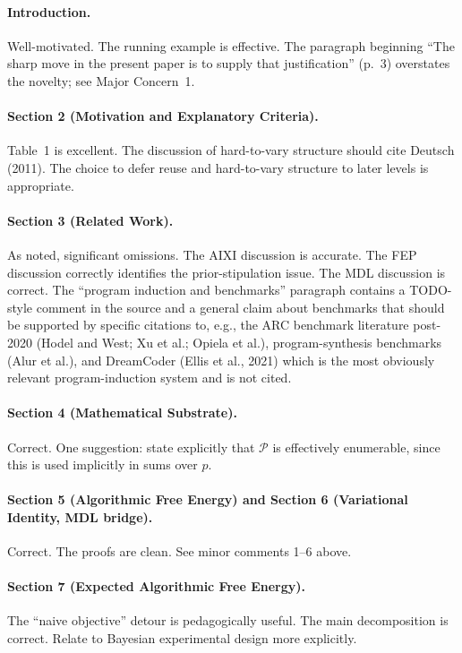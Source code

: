 \documentclass[11pt]{article}
\begin{document}
\paragraph{Introduction.} Well-motivated. The running example is effective. The paragraph beginning ``The sharp move in the present paper is to supply that justification'' (p.~3) overstates the novelty; see Major Concern~1.

\paragraph{Section 2 (Motivation and Explanatory Criteria).} Table~1 is excellent. The discussion of hard-to-vary structure should cite Deutsch (2011). The choice to defer reuse and hard-to-vary structure to later levels is appropriate.

\paragraph{Section 3 (Related Work).} As noted, significant omissions. The AIXI discussion is accurate. The FEP discussion correctly identifies the prior-stipulation issue. The MDL discussion is correct. The ``program induction and benchmarks'' paragraph contains a TODO-style comment in the source and a general claim about benchmarks that should be supported by specific citations to, e.g., the ARC benchmark literature post-2020 (Hodel and West; Xu et al.; Opiela et al.), program-synthesis benchmarks (Alur et al.), and DreamCoder (Ellis et al., 2021) which is the most obviously relevant program-induction system and is not cited.

\paragraph{Section 4 (Mathematical Substrate).} Correct. One suggestion: state explicitly that $\mathcal{P}$ is effectively enumerable, since this is used implicitly in sums over $p$.

\paragraph{Section 5 (Algorithmic Free Energy) and Section 6 (Variational Identity, MDL bridge).} Correct. The proofs are clean. See minor comments 1--6 above.

\paragraph{Section 7 (Expected Algorithmic Free Energy).} The ``naive objective'' detour is pedagogically useful. The main decomposition is correct. Relate to Bayesian experimental design more explicitly.
\end{document}
